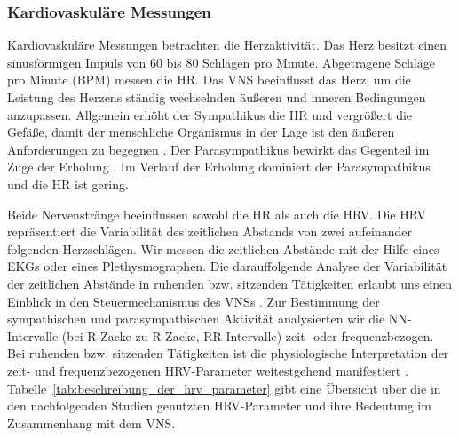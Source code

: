 \subsubsection{Kardiovaskuläre Messungen} 

\label{ssub:kardiovaskulare_messungen}

Kardiovaskuläre Messungen betrachten die Herzaktivität. Das Herz besitzt einen sinusförmigen Impuls von 60 bis 80 Schlägen pro Minute. Abgetragene Schläge pro Minute (\ac{BPM}) messen die \ac{HR}. Das \ac{VNS} beeinflusst das Herz, um die Leistung des Herzens ständig wechselnden äußeren und inneren Bedingungen anzupassen. Allgemein erhöht der Sympathikus die \ac{HR} und vergrößert die Gefäße, damit der menschliche Organismus in der Lage ist den äußeren Anforderungen zu begegnen \citep[][S.~226]{Porges1995}. Der Parasympathikus bewirkt das Gegenteil im Zuge der Erholung \citep[][S.~226]{Porges1995}. Im Verlauf der Erholung dominiert der Parasympathikus und die \ac{HR} ist gering. 

Beide Nervenstränge beeinflussen sowohl die \ac{HR} als auch die \ac{HRV}. Die \ac{HRV} repräsentiert die Variabilität des zeitlichen Abstands von zwei aufeinander folgenden Herzschlägen. Wir messen die zeitlichen Abstände mit der Hilfe eines \ac{EKG}s oder eines Plethysmographen. Die darauffolgende Analyse der Variabilität der zeitlichen Abstände in ruhenden bzw. sitzenden Tätigkeiten erlaubt uns einen Einblick in den Steuermechanismus des \ac{VNS}s \citep{Jalife1983}. Zur Bestimmung der sympathischen und parasympathischen Aktivität analysierten wir die NN-Intervalle (bei R-Zacke zu R-Zacke, RR-Intervalle) zeit- oder frequenzbezogen. Bei ruhenden bzw. sitzenden Tätigkeiten ist die physiologische Interpretation der zeit- und frequenzbezogenen \ac{HRV}-Parameter weitestgehend manifestiert \citep[][S.~360]{TaskForce1996}. Tabelle~\ref{tab:beschreibung_der_hrv_parameter} gibt eine Übersicht über die in den nachfolgenden Studien genutzten \ac{HRV}-Parameter und ihre Bedeutung im Zusammenhang mit dem \ac{VNS}. 

